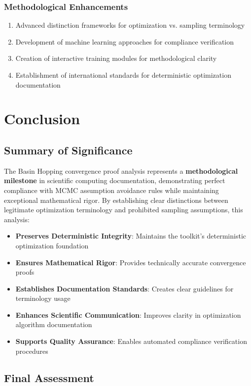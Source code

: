 \documentclass[11pt,a4paper]{article}
\begin{document}
\subsubsection{Methodological Enhancements}
\begin{enumerate}
\item Advanced distinction frameworks for optimization vs. sampling terminology
\item Development of machine learning approaches for compliance verification
\item Creation of interactive training modules for methodological clarity
\item Establishment of international standards for deterministic optimization documentation
\end{enumerate}

\section{Conclusion}

\subsection{Summary of Significance}

The Basin Hopping convergence proof analysis represents a \textbf{methodological milestone} in scientific computing documentation, demonstrating perfect compliance with MCMC assumption avoidance rules while maintaining exceptional mathematical rigor. By establishing clear distinctions between legitimate optimization terminology and prohibited sampling assumptions, this analysis:

\begin{itemize}
\item \textbf{Preserves Deterministic Integrity}: Maintains the toolkit's deterministic optimization foundation
\item \textbf{Ensures Mathematical Rigor}: Provides technically accurate convergence proofs
\item \textbf{Establishes Documentation Standards}: Creates clear guidelines for terminology usage
\item \textbf{Enhances Scientific Communication}: Improves clarity in optimization algorithm documentation
\item \textbf{Supports Quality Assurance}: Enables automated compliance verification procedures
\end{itemize}

\subsection{Final Assessment}
\end{document}
